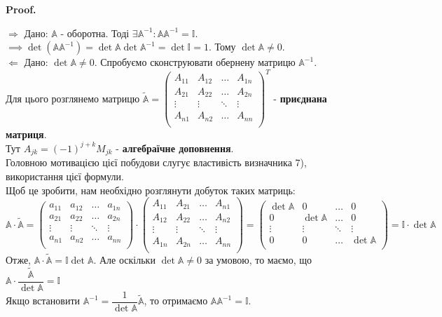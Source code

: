 \documentclass[a4paper, 10pt]{article}
\makeatletter
\def\rightproof{$\boxed{\Rightarrow}$ }
\def\leftproof{$\boxed{\Leftarrow}$ }
\theoremstyle{theoremdd}
\renewenvironment{proof}[1][Proof.\\]{\par
\pushQED{\hfill \qed}%
\normalfont \topsep6\p@\@plus6\p@\relax
\trivlist
\item\relax
{\bfseries
#1\@addpunct{.}}\hspace\labelsep\ignorespaces
}{%
\popQED\endtrivlist\@endpefalse
}
\makeatother
\begin{document}
\begin{proof}
\rightproof Дано: $\mathbb{A}$ - оборотна. Тоді $\exists \mathbb{A}^{-1}: \mathbb{A} \mathbb{A}^{-1} = \mathbb{I}$.\\
$\implies \det (\mathbb{A} \mathbb{A}^{-1}) = \det \mathbb{A} \det \mathbb{A}^{-1} = \det \mathbb{I} = 1$. Тому $\det \mathbb{A} \neq 0$.
\bigskip \\
\leftproof Дано: $\det \mathbb{A} \neq 0$. Спробуємо сконструювати обернену матрицю $\mathbb{A}^{-1}$.\\
Для цього розглянемо матрицю $\tilde{\mathbb{A}} = \begin{pmatrix}
A_{11} & A_{12} & \dots & A_{1n} \\
A_{21} & A_{22} & \dots & A_{2n} \\
\vdots & \vdots & \ddots & \vdots \\
A_{n1} & A_{n2} & \dots & A_{nn} \\
\end{pmatrix}^T$ - \textbf{приєднана матриця}.\\
Тут $A_{jk} = (-1)^{j+k}M_{jk}$ - \textbf{алгебраїчне доповнення}.\\
Головною мотивацією цієї побудови слугує властивість визначника 7), використання цієї формули.\\
Щоб це зробити, нам необхідно розглянути добуток таких матриць:\\
$\mathbb{A} \cdot \tilde{\mathbb{A}} = \begin{pmatrix}
a_{11} & a_{12} & \dots & a_{1n} \\
a_{21} & a_{22} & \dots & a_{2n} \\
\vdots & \vdots & \ddots & \vdots \\
a_{n1} & a_{n2} & \dots & a_{nn} \\
\end{pmatrix} \cdot \begin{pmatrix}
A_{11} & A_{21} & \dots & A_{n1} \\
A_{12} & A_{22} & \dots & A_{n2} \\
\vdots & \vdots & \ddots & \vdots \\
A_{1n} & A_{2n} & \dots & A_{nn} \\
\end{pmatrix} = \begin{pmatrix}
\det \mathbb{A} & 0 & \dots & 0 \\
0 & \det \mathbb{A} & \dots & 0 \\
\vdots & \vdots & \ddots & \vdots \\
0 & 0 & \dots & \det \mathbb{A} \\
\end{pmatrix} = \mathbb{I} \cdot \det \mathbb{A}$\\
Отже, $\mathbb{A} \cdot \tilde{\mathbb{A}} =\mathbb{I} \det \mathbb{A}$. Але оскільки $\det \mathbb{A} \neq 0$ за умовою, то маємо, що\\
$\mathbb{A} \cdot \dfrac{\tilde{\mathbb{A}}}{\det \mathbb{A}} = \mathbb{I}$\\
Якщо встановити $\mathbb{A}^{-1} = \dfrac{1}{\det \mathbb{A}} \tilde{\mathbb{A}}$, то отримаємо $\mathbb{A} \mathbb{A}^{-1} = \mathbb{I}$.
\end{proof}
\end{document}

